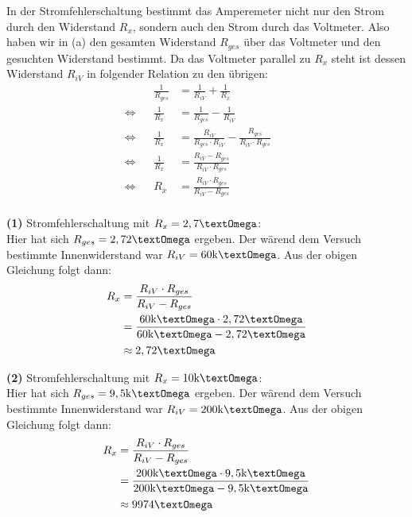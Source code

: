 \documentclass[]{article}
\newcommand{\eq}{\Leftrightarrow}
\newcommand{\unit}[1]{\text{#1}}
\begin{document}
	In der Stromfehlerschaltung bestimmt das Amperemeter nicht nur den Strom durch den Widerstand $R_x$, sondern auch den Strom durch das Voltmeter. Also haben wir in (a) den gesamten Widerstand $R_{ges}$ über das Voltmeter und den gesuchten Widerstand bestimmt. Da das Voltmeter parallel zu $R_x$ steht ist dessen Widerstand $R_{iV}$ in folgender Relation zu den übrigen:
	\begin{align*}
		&&\frac{1}{R_{ges}} &= \frac{1}{R_{iV}}+\frac{1}{R_x}&&\\
		\eq&& \frac{1}{R_x} &= \frac{1}{R_{ges}}-\frac{1}{R_{iV}}&&\\
		\eq&& \frac{1}{R_x} &= \frac{R_{iV}}{R_{ges}\cdot R_{iV}}-\frac{R_{ges}}{R_{iV} \cdot R_{ges}}&&\\
		\eq&& \frac{1}{R_x} &= \frac{R_{iV}-R_{ges}}{R_{iV} \cdot R_{ges}}&&\\
		\eq&& R_x &= \frac{R_{iV} \cdot R_{ges}}{R_{iV}-R_{ges}}&&\\
	\end{align*}

	\textbf{(1)} Stromfehlerschaltung mit $R_x = 2,7\unit{\textOmega}$:\\
	Hier hat sich $R_{ges} = 2,72\unit{\textOmega}$ ergeben. Der wärend dem Versuch bestimmte Innenwiderstand war $R_{iV} = 60\unit{k\textOmega}$. Aus der obigen Gleichung folgt dann:
	\begin{align*}
		&&R_x &= \frac{R_{iV} \cdot R_{ges}}{R_{iV}-R_{ges}}&&\\
		&& &= \frac{60\unit{k\textOmega} \cdot 2,72\unit{\textOmega}}{60\unit{k\textOmega} - 2,72\unit{\textOmega}}&&\\
		&& &\approx 2,72\unit{\textOmega}&&\\
	\end{align*}

	\textbf{(2)} Stromfehlerschaltung mit $R_x = 10\unit{k\textOmega}$:\\
	Hier hat sich $R_{ges} = 9,5\unit{k\textOmega}$ ergeben. Der wärend dem Versuch bestimmte Innenwiderstand war $R_{iV} = 200\unit{k\textOmega}$. Aus der obigen Gleichung folgt dann:
	\begin{align*}
		&&R_x &= \frac{R_{iV} \cdot R_{ges}}{R_{iV}-R_{ges}}&&\\
		&& &= \frac{200\unit{k\textOmega} \cdot 9,5\unit{k\textOmega}}{200\unit{k\textOmega} - 9,5\unit{k\textOmega}}&&\\
		&& &\approx 9974\unit{\textOmega}&&\\
	\end{align*}
\end{document}
